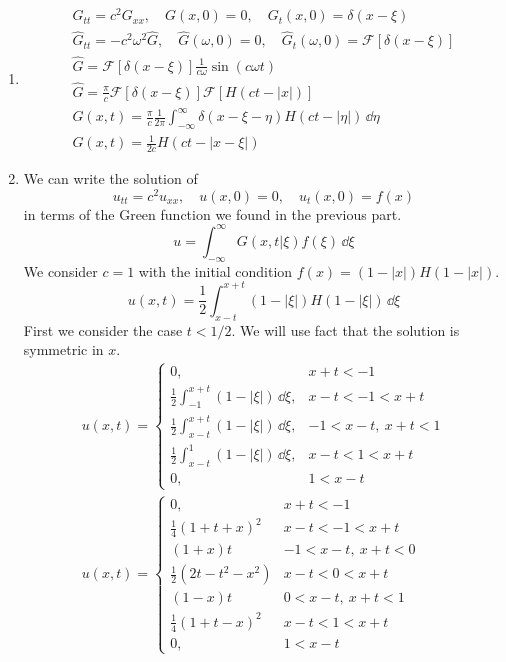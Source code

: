 {\begin{Solution}
  \begin{enumerate} 
  \item 
    \begin{gather*}
      G_{t t} = c^2 G_{x x}, \quad G(x,0) = 0, \quad G_t(x,0) = \delta(x-\xi)
      \\
      \hat{G}_{t t} = - c^2 \omega^2 \hat{G}, \quad \hat{G}(\omega,0) = 0, 
      \quad \hat{G}_t(\omega,0) = \mathcal{F}[\delta(x-\xi)]
      \\
      \hat{G} = \mathcal{F}[\delta(x-\xi)] \frac{1}{c \omega} \sin(c \omega t)
      \\
      \hat{G} = \frac{\pi}{c} \mathcal{F}[\delta(x-\xi)] \mathcal{F}[H(c t - |x|)]
      \\
      G(x,t) = \frac{\pi}{c} \frac{1}{2 \pi} \int_{-\infty}^\infty \delta(x-\xi-\eta) H(c t - |\eta|) \,\dd \eta
      \\
      G(x,t) = \frac{1}{2 c} H(c t - |x - \xi|)
    \end{gather*}
  \item 
    We can write the solution of 
    \[
    u_{t t} = c^2 u_{x x}, \quad u(x,0) = 0, \quad u_t(x,0) = f(x)
    \]
    in terms of the Green function we found in the previous part.
    \[
    u = \int_{-\infty}^\infty G(x,t|\xi) f(\xi) \,\dd \xi
    \]
    We consider $c = 1$ with the initial condition 
    $f(x) = (1 - |x|) H(1 - |x|)$.
    \[
    u(x,t) = \frac{1}{2} \int_{x-t}^{x+t} (1 - |\xi|) H(1 - |\xi|) \,\dd \xi
    \]
    First we consider the case $t < 1/2$.  We will use fact that the solution 
    is symmetric in $x$.
    \begin{gather*}
      u(x,t) = \begin{cases}
        0, &x+t < -1
        \\
        \frac{1}{2} \int_{-1}^{x+t} (1 - |\xi|) \,\dd \xi, &x-t < -1 < x+t
        \\
        \frac{1}{2} \int_{x-t}^{x+t} (1 - |\xi|) \,\dd \xi, &-1 < x-t,\ x+t < 1
        \\
        \frac{1}{2} \int_{x-t}^{1} (1 - |\xi|) \,\dd \xi, &x-t < 1 < x+t
        \\
        0, &1 < x-t
      \end{cases}
      \\
      u(x,t) = \begin{cases}
        0, &x+t < -1
        \\
        \frac{1}{4} (1 + t + x)^2 &x-t < -1 < x+t
        \\
        (1+x) t &-1 < x-t,\  x+t < 0
        \\
        \frac{1}{2} (2 t - t^2 - x^2) &x-t < 0 < x+t
        \\
        (1-x) t &0 < x-t,\  x+t < 1
        \\
        \frac{1}{4} (1 + t - x)^2 &x-t < 1 < x+t
        \\
        0, &1 < x-t
      \end{cases}
    \end{gather*}



\end{enumerate}
\end{Solution}}
